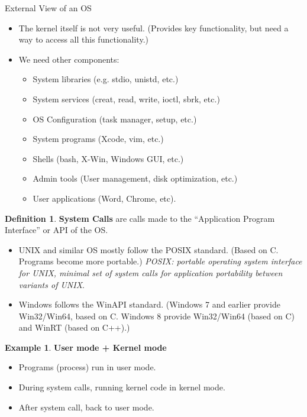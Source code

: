 \documentclass[11pt,a4paper]{article}
\theoremstyle{definition}
\newtheorem{definition}{Definition}[section]
\newtheorem{example}{Example}[section]
\newenvironment{myitemize}
{ \begin{itemize}
    \setlength{\itemsep}{5pt}
    \setlength{\parskip}{0pt}
    \setlength{\parsep}{0pt}     }
{ \end{itemize}                  }
\begin{document}
\begin{tcolorbox}
	\textsf{External View of an OS}
	\begin{myitemize}
		\item The kernel itself is not very useful. (Provides key functionality, but need a way to access all this functionality.)
		\item We need other components:
		\begin{myitemize}
			\item System libraries (e.g. stdio, unistd, etc.)
			\item System services (creat, read, write, ioctl, sbrk, etc.)
			\item OS Configuration (task manager, setup, etc.)
			\item System programs (Xcode, vim, etc.)
			\item Shells (bash, X-Win, Windows GUI, etc.)
			\item Admin tools (User management, disk optimization, etc.)
			\item User applications (Word, Chrome, etc).
		\end{myitemize}
	\end{myitemize}
	
\end{tcolorbox}

\begin{definition}{\textbf{System Calls}}
	are calls made to the “Application Program Interface” or API of the OS.
	\begin{myitemize}
		\item UNIX  and similar OS mostly follow the POSIX standard. (Based on C. Programs become more portable.) \textit{POSIX: portable operating system interface for UNIX, minimal set of system calls for application portability between variants of UNIX}.
		\item Windows follows the WinAPI standard. (Windows 7 and earlier provide Win32/Win64, based on C.
Windows 8 provide Win32/Win64 (based on C) and WinRT (based on C++).)
	\end{myitemize}
\end{definition}

\begin{example}{\textbf{User mode + Kernel mode}}
	\begin{myitemize}
		\item Programs (process) run in user mode.
		\item During system calls, running kernel code in kernel mode.
		\item After system call, back to user mode.
	\end{myitemize}
\end{example}
\end{document}
